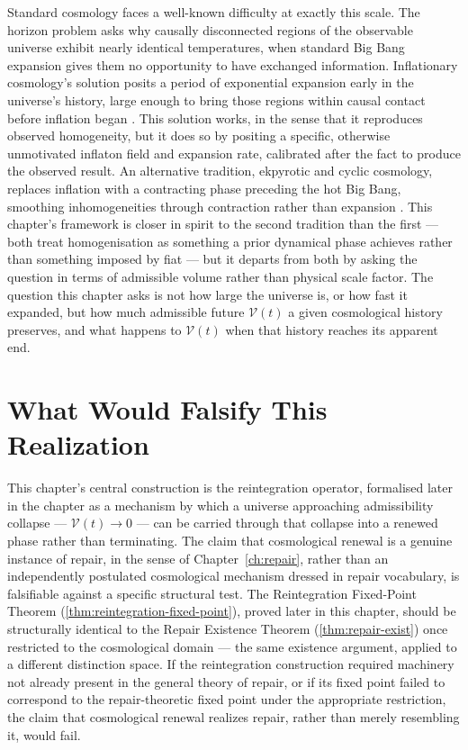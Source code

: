 \documentclass[12pt,twoside,openright]{book}
\begin{document}
Standard cosmology faces a well-known difficulty at exactly
this scale. The horizon problem asks why causally
disconnected regions of the observable universe exhibit
nearly identical temperatures, when standard Big Bang
expansion gives them no opportunity to have exchanged
information. Inflationary cosmology's solution posits a
period of exponential expansion early in the universe's
history, large enough to bring those regions within causal
contact before inflation began \parencite{guth1981}. This
solution works, in the sense that it reproduces observed
homogeneity, but it does so by positing a specific, otherwise
unmotivated inflaton field and expansion rate, calibrated
after the fact to produce the observed result. An alternative
tradition, ekpyrotic and cyclic cosmology, replaces inflation
with a contracting phase preceding the hot Big Bang, smoothing
inhomogeneities through contraction rather than expansion
\parencite{steinhardt2002}. This chapter's framework is closer
in spirit to the second tradition than the first --- both
treat homogenisation as something a prior dynamical phase
achieves rather than something imposed by fiat --- but it
departs from both by asking the question in terms of
admissible volume rather than physical scale factor. The
question this chapter asks is not how large the universe is,
or how fast it expanded, but how much admissible future
$\mathcal{V}(t)$ a given cosmological history preserves, and
what happens to $\mathcal{V}(t)$ when that history reaches its
apparent end.

\section{What Would Falsify This Realization}
\label{sec:ch18-falsifiability}

This chapter's central construction is the reintegration
operator, formalised later in the chapter as a mechanism by
which a universe approaching admissibility collapse ---
$\mathcal{V}(t)\to0$ --- can be carried through that collapse
into a renewed phase rather than terminating. The claim that
cosmological renewal is a genuine instance of repair, in the
sense of Chapter~\ref{ch:repair}, rather than an independently
postulated cosmological mechanism dressed in repair
vocabulary, is falsifiable against a specific structural test.
The Reintegration Fixed-Point Theorem
(\cref{thm:reintegration-fixed-point}), proved later in this
chapter, should be structurally identical to the Repair
Existence Theorem (\cref{thm:repair-exist}) once restricted to
the cosmological domain --- the same existence argument,
applied to a different distinction space. If the reintegration
construction required machinery not already present in the
general theory of repair, or if its fixed point failed to
correspond to the repair-theoretic fixed point under the
appropriate restriction, the claim that cosmological renewal
realizes repair, rather than merely resembling it, would fail.
\end{document}
